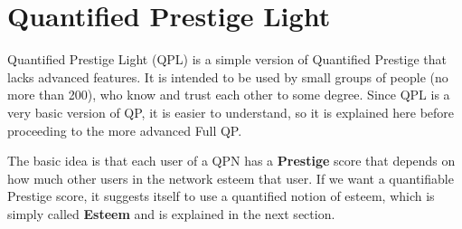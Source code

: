 \documentclass[a4paper,12pt]{scrartcl}
\begin{document}
\part{Quantified Prestige Light}
Quantified Prestige Light (QPL) is a simple version of Quantified Prestige that lacks advanced features. It is intended to be used by small groups of people (no more than 200), who know and trust each other to some degree. Since QPL is a very basic version of QP, it is easier to understand, so it is explained here before proceeding to the more advanced Full QP.

The basic idea is that each user of a QPN has a \textbf{Prestige} score that depends on how much other users in the network esteem that user. If we want a quantifiable Prestige score, it suggests itself to use a quantified notion of esteem, which is simply called \textbf{Esteem} and is explained in the next section.  
\end{document}
